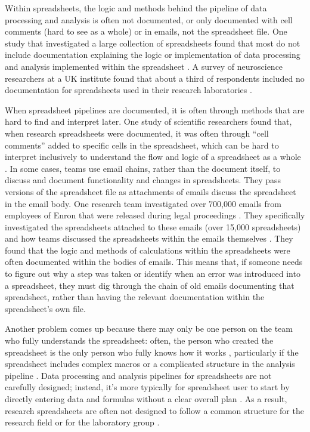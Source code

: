 \documentclass[]{tufte-book}
\begin{document}
Within spreadsheets, the logic and methods behind the pipeline of data
processing and analysis is often not documented, or only documented with cell
comments (hard to see as a whole) or in emails, not the spreadsheet file.
One study that investigated a large collection of spreadsheets found that most
do not include documentation explaining the logic or implementation of data
processing and analysis implemented within the spreadsheet
\citep{hermans2016spreadsheets}. A survey of neuroscience researchers at a UK
institute found that about a third of respondents included no documentation
for spreadsheets used in their research laboratories \citep{altarawneh2017pilot}.

When spreadsheet pipelines are documented, it is often through methods that are
hard to find and interpret later. One study of scientific researchers found
that, when research spreadsheets were documented, it was often through ``cell
comments'' added to specific cells in the spreadsheet, which can be hard to
interpret inclusively to understand the flow and logic of a spreadsheet as a
whole \citep{altarawneh2017pilot}. In some cases, teams use email chains, rather than
the document itself, to discuss and document functionality and changes in
spreadsheets. They pass versions of the spreadsheet file as attachments of
emails discuss the spreadsheet in the email body. One research team investigated
over 700,000 emails from employees of Enron that were released during legal
proceedings \citep{hermans2015enron}. They specifically investigated the spreadsheets
attached to these emails (over 15,000 spreadsheets) and how teams discussed the
spreadsheets within the emails themselves . They found that the logic and
methods of calculations within the spreadsheets were often documented within the
bodies of emails. This means that, if someone needs to figure out why a step was
taken or identify when an error was introduced into a spreadsheet, they must dig
through the chain of old emails documenting that spreadsheet, rather than having
the relevant documentation within the spreadsheet's own file.

Another problem comes up because there may only be one person on the team who
fully understands the spreadsheet: often, the person who created the spreadsheet
is the only person who fully knows how it works \citep{myneni2010organization},
particularly if the spreadsheet includes complex macros or a complicated
structure in the analysis pipeline \citep{creeth1985microcomputer}. Data processing
and analysis pipelines for spreadsheets are not carefully designed; instead,
it's more typically for spreadsheet user to start by directly entering data and
formulas without a clear overall plan \citep{altarawneh2017pilot}. As a result,
research spreadsheets are often not designed to follow a common structure for
the research field or for the laboratory group \citep{anderson2007issues}.
\end{document}
